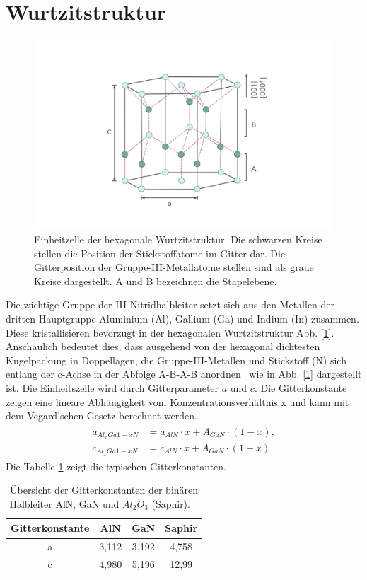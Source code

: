 \section{Wurtzitstruktur}

\begin{figure}[!htb]
    \centering
    \begin{minipage}[t]{\linewidth}
        \centering
        \includegraphics[width=0.6\linewidth]{Bilder/Wurtzite.png}
    \end{minipage}%
     \caption{Einheitzelle der hexagonale Wurtzitstruktur. Die schwarzen Kreise stellen die Position der Stickstoffatome im Gitter dar. Die Gitterposition der Gruppe-III-Metallatome stellen sind als graue Kreise dargestellt. A und B bezeichnen die Stapelebene.  }
        \label{fig:wurtz}
\end{figure}
\noindent
Die wichtige Gruppe der III-Nitridhalbleiter setzt sich aus den Metallen
der dritten Hauptgruppe Aluminium (Al), Gallium (Ga) und Indium (In) zusammen.
Diese kristallisieren bevorzugt in der hexagonalen Wurtzitstruktur Abb. [\ref{fig:wurtz}].
Anschaulich bedeutet dies, dass ausgehend von der hexagonal dichtesten Kugelpackung in Doppellagen, die Gruppe-III-Metallen und Stickstoff (N) sich entlang der c-Achse in der Abfolge A-B-A-B anordnen~\cite{buchc} wie in Abb. [\ref{fig:wurtz}] dargestellt ist. Die Einheitszelle wird durch Gitterparameter $a$ und $c$. Die Gitterkonstante zeigen eine lineare Abhängigkeit vom Konzentrationsverhältnis x und kann mit dem Vegard'schen Gesetz berechnet werden.
%
\begin{align}
\begin{split}
    a_{Al_{x}Ga{1-x}N} &= a_{AlN} \cdot x + A_{GaN} \cdot (1-x)  ,
    \\
    c_{Al_{x}Ga{1-x}N} &= c_{AlN} \cdot x + A_{GaN} \cdot (1-x) 
\end{split}
\end{align}
%
Die Tabelle \ref{table:tab1} zeigt die typischen Gitterkonstanten.
 \begin{table}[]
\centering
\begin{tabular}{|c|c|c|c|}
\hline
\multicolumn{1}{|l|}{Gitterkonstante} & AlN & GaN & Saphir \\ \hline \hline
a & 3,112 & 3,192 & 4,758 \\ \hline
c & 4,980 & 5,196 & 12,99 \\ \hline
\end{tabular}
\caption{Übersicht der Gitterkonstanten der binären Halbleiter AlN, GaN und $Al_{2}O_{3}$ (Saphir). ~\cite{pohl} }
\label{table:tab1}
\end{table}

